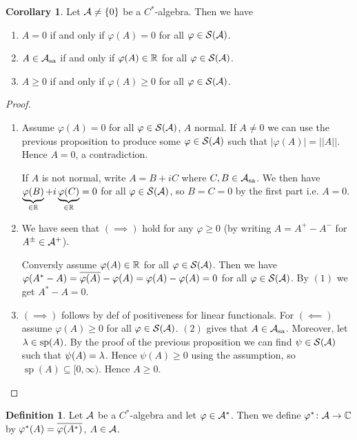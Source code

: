 \documentclass[10pt,english,a4paper]{article}
\theoremstyle{definition}
\newtheorem*{definition}{Definition}
\newtheorem*{corollary}{Corollary}
\def\Assa{\As_{\text{sa}}}
\DeclareMathOperator{\Sp}{sp}
\def\vphi{\varphi}
\begin{document}
\begin{corollary}
    Let $\mathcal{A} \neq \{0\}$ be a $C^*$-algebra. Then we have 
\begin{enumerate}[(1)]
    \item $A =0$ if and only if $\vphi(A)=0$ for all $\vphi \in \Ss(\As)$.
    \item $A \in\Assa$ if and only if $\vphi(A)\in \R$ for all $\vphi \in \Ss(\As)$.
    \item $A \geq 0$ if and only if $\vphi(A)\geq 0$ for all $\vphi \in \Ss(\As)$.
\end{enumerate}
\end{corollary}
\begin{proof}

\begin{enumerate}[(1)]
    \item Assume $\vphi(A) =0$ for all $\vphi \in \Ss(\As)$, $A$ normal.
If $A\neq 0$ we can use the previous proposition to produce some $\vphi \in \Ss(\As)$
such that $|\vphi(A)| = ||A||$. Hence $A = 0$, a contradiction. 

If $A$ is not normal, write $A = B + iC$ where $C,B\in \Assa$. We then have 
$\ub{\vphi(B)}_{\in \R} + i\ub{\vphi(C)}_{\in \R} = 0$ for all $\vphi\in \Ss(\As)$,
so $B = C = 0$ by the first part i.e. $A = 0$.

\item We have seen that $(\implies)$ hold for any $\vphi\geq 0$ 
(by writing $A = A^+-A^-$ for $A^{\pm} \in \mathcal{A}^+$).

Conversly assume $\vphi(A) \in \R$ for all $\vphi \in \Ss(\As)$. 
Then we have $\vphi(A^*-A) = \ol{\vphi(A)}-\vphi(A) = \vphi(A)-\vphi(A) = 0$
for all $\vphi\in \Ss(\As)$. By $(1)$ we get $A^*-A=0$.

\item $(\implies)$ follows by def of positiveness for linear functionals.
For $(\impliedby)$  assume $\vphi(A)\geq 0$ for all $\vphi\in \Ss(\As)$. 
$(2)$ gives that $A \in \Assa$. Moreover, let $\la \in \Sp(A)$. By the proof of the previous
proposition we can find $\psi \in \mathcal{S}(\mathcal{A})$ such that $\psi(A)= \lambda$.
Hence $\psi(A)\geq 0$ using the assumption, so $\Sp(A)\subseteq [0,\infty)$.
Hence $A\geq 0$.
\end{enumerate}

\end{proof}
\begin{definition}
    Let $\mathcal{A}$ be a $C^*$-algebra and let 
     $\vphi \in \As^*$. Then we define 
$\vphi^*\colon \As\to \C$ by $\vphi^*(A) = \ol{\vphi(A^*)}$, $A\in \mathcal{A}$.
\end{definition}
\end{document}
